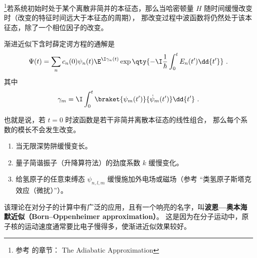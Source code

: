 
\begin{issues}
\issueTODO
\end{issues}

\footnote{参考 \cite{GriffE} 的章节： The Adiabatic Approximation}若系统初始时处于某个离散非简并的本征态，那么当哈密顿量 $H$ 随时间缓慢改变时（改变的特征时间远大于本征态的周期）， 那改变过程中波函数将仍然处于该本征态，除了一个相位因子的改变。

渐进近似下含时薛定谔方程的通解是
\begin{equation}\label{eq_AdiaQM_2}
\Psi(t) = \sum_n c_n(0) \psi_n(t) \E^{\I\gamma_n(t)}\exp\qty{-\I\frac{1}{\hbar} \int_0^t E_n(t')\dd{t'}}~.
\end{equation}
其中
\begin{equation}
\gamma_m = \I \int_0^t \braket{\psi_m(t')}{\dot\psi_m(t')}\dd{t'}~.
\end{equation}

也就是说，若 $t=0$ 时波函数是若干非简并离散本征态的线性组合， 那么每个系数的模长不会发生改变。

\begin{example}{}
\begin{enumerate}
\item 当无限深势阱缓慢变长。
\item 量子简谐振子（升降算符法）的劲度系数 $k$ 缓慢变化。
\item 给氢原子的任意束缚态 $\psi_{n,l,m}$ 缓慢施加外电场或磁场（参考 “类氢原子斯塔克效应（微扰）”）。
\end{enumerate}
\end{example}

该理论在对分子的计算中有广泛的应用，且有一个响亮的名字，叫\textbf{波恩—奥本海默近似（Born–Oppenheimer approximation）}。 这是因为在分子运动中，原子核的运动速度通常要比电子慢得多，使渐进近似效果较好。


